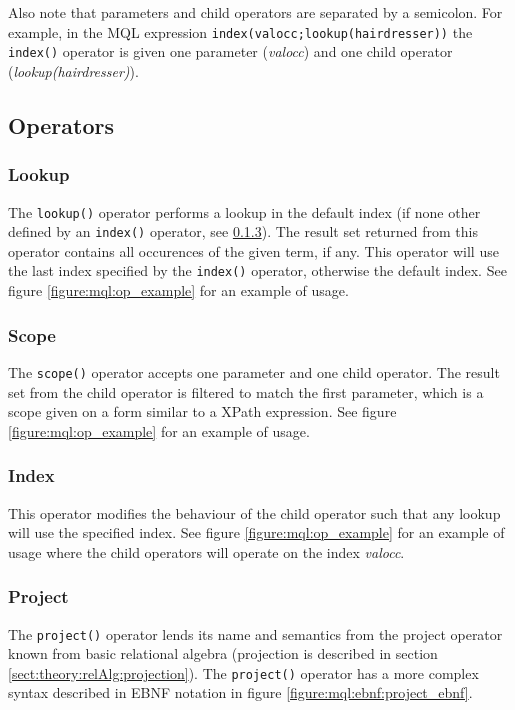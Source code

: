 Also note that parameters and child operators are separated by a semicolon. For
example, in the MQL expression \texttt{index(valocc;lookup(hairdresser))} the
\texttt{index()} operator is given one parameter (\textit{valocc}) and one
child operator (\textit{lookup(hairdresser)}).

\subsection{Operators}
\label{sect:method:marsOperators}

\subsubsection{Lookup}
\label{sect:method:marsOperators:lookup}
The \texttt{lookup()} operator performs a lookup in the default index (if none
other defined by an \texttt{index()} operator, see
\ref{sect:method:marsOperators:index}). The result set returned from this
operator contains all occurences of the given term, if any. This operator will
use the last index specified by the \texttt{index()} operator, otherwise the
default index. See figure \ref{figure:mql:op_example} for an example of usage. 

\subsubsection{Scope}
\label{sect:method:marsOperators:scope}
The \texttt{scope()} operator accepts one parameter and one child operator. The
result set from the child operator is filtered to match the first parameter, which is a
scope given on a form similar to a XPath expression. See figure
\ref{figure:mql:op_example} for an example of usage. 

\subsubsection{Index}
\label{sect:method:marsOperators:index}
This operator modifies the behaviour of the child operator such that any lookup
will use the specified index. See figure \ref{figure:mql:op_example} for an
example of usage where the child operators will operate on the index
\textit{valocc}.

\subsubsection{Project}
\label{sect:method:marsOperators:project}
The \texttt{project()} operator lends its name and semantics from the project
operator known from basic relational algebra (projection is described in
section \ref{sect:theory:relAlg:projection}). The \texttt{project()} operator
has a more complex syntax described in EBNF notation in figure
\ref{figure:mql:ebnf:project_ebnf}.

